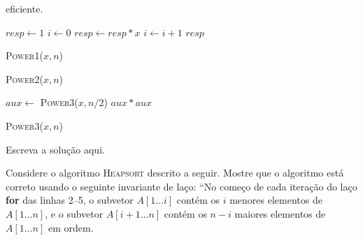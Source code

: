 \documentclass[a4paper]{exam}
\begin{document}
\begin{questions}
  eficiente.
  \setlength{\algoheightrule}{0pt}
  \setlength{\algotitleheightrule}{0pt}
  \begin{center}
    \vspace{-1cm}
    \begin{minipage}[t][][c]{.25\textwidth}
      \begin{algorithm}[H]
        \NoCaptionOfAlgo
        \DontPrintSemicolon
        $resp \gets 1$\;
        $i \gets 0$\;
         {
          $resp \gets resp * x$\;
          $i \gets i + 1$\;
        }
        \Return $resp$\;
        \caption{\textsc{Power1}($x, n$)}
      \end{algorithm}
    \end{minipage}%
  \begin{minipage}[t][][c]{.35\textwidth} 
      \begin{algorithm}[H]
        \NoCaptionOfAlgo
        \DontPrintSemicolon
        \caption{\textsc{Power2}($x,n$)}
      \end{algorithm}
    \end{minipage}%
    \begin{minipage}[t][][c]{.38\textwidth} 
      \begin{algorithm}[H]
        \NoCaptionOfAlgo
        \DontPrintSemicolon
         {
          $aux \leftarrow $ \textsc{Power3}($x, n/2$)\;
          \Return $aux*aux$\;
        }
        \caption{\textsc{Power3}($x,n$)}
      \end{algorithm}
    \end{minipage}
  \end{center}
  \begin{solution}
    Escreva a solução aqui.
  \end{solution}
  \question Considere o algoritmo \textsc{Heapsort} descrito a
  seguir. Mostre que o algoritmo está correto usando o seguinte
  invariante de laço: ``No começo de cada iteração do laço
  \textbf{for} das linhas 2--5, o subvetor $A[1 \dots i]$ contém os $i$
  menores elementos de $A[1 \dots n]$, e o subvetor $A[i{+}1 \dots n]$ contém
  os $n-i$ maiores elementos de $A[1 \dots n]$ em ordem.

  \setlength{\algoheightrule}{0pt}
  \setlength{\algotitleheightrule}{0pt}
  

\end{questions}
\end{document}
